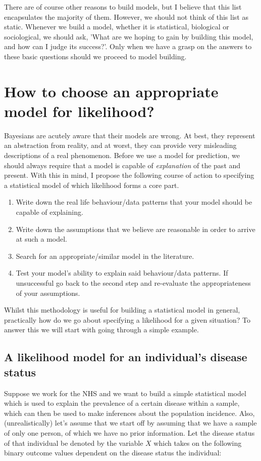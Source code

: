 \documentclass[11pt,fullpage]{book}
\begin{document}
There are of course other reasons to build models, but I believe that this list encapsulates the majority of them. However, we should not think of this list as static. Whenever we build a model, whether it is statistical, biological or sociological, we should ask, 'What are we hoping to gain by building this model, and how can I judge its success?'. Only when we have a grasp on the answers to these basic questions should we proceed to model building.

\section{How to choose an appropriate model for likelihood?}
Bayesians are acutely aware that their models are wrong. At best, they represent an abstraction from reality, and at worst, they can provide very misleading descriptions of a real phenomenon. Before we use a model for prediction, we should always require that a model is capable of \textit{explanation} of the past and present. With this in mind, I propose the following course of action to specifying a statistical model of which likelihood forms a core part.

\begin{enumerate}
\item Write down the real life behaviour/data patterns that your model should be capable of explaining.
\item Write down the assumptions that we believe are reasonable in order to arrive at such a model.
\item Search for an appropriate/similar model in the literature.
\item Test your model's ability to explain said behaviour/data patterns. If unsuccessful go back to the second step and re-evaluate the appropriateness of your assumptions.
\end{enumerate}

Whilst this methodology is useful for building a statistical model in general, practically how do we go about specifying a likelihood for a given situation? To answer this we will start with going through a simple example.

\subsection{A likelihood model for an individual's disease status}\label{sec:Likelihood_individualDisease}
Suppose we work for the NHS and we want to build a simple statistical model which is used to explain the prevalence of a certain disease within a sample, which can then be used to make inferences about the population incidence. Also, (unrealistically) let's assume that we start off by assuming that we have a sample of only one person, of which we have no prior information. Let the disease status of that individual be denoted by the variable $X$ which takes on the following binary outcome values dependent on the disease status the individual:
\end{document}
